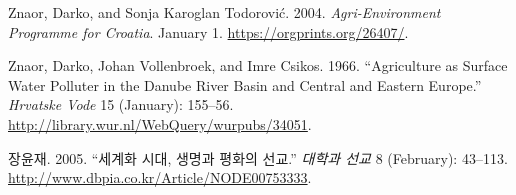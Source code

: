 \begin{CSLReferences}{1}{1}
Znaor, Darko, and Sonja Karoglan Todorović. 2004. \emph{Agri-Environment
Programme for Croatia}. January 1. \url{https://orgprints.org/26407/}.

Znaor, Darko, Johan Vollenbroek, and Imre Csikos. 1966. {``Agriculture
as Surface Water Polluter in the Danube River Basin and Central and
Eastern Europe.''} \emph{Hrvatske Vode} 15 (January): 155--56.
\url{http://library.wur.nl/WebQuery/wurpubs/34051}.

장윤재. 2005. {``세계화 시대, 생명과 평화의 선교.''} \emph{대학과 선교}
8 (February): 43--113.
\url{http://www.dbpia.co.kr/Article/NODE00753333}.

\end{CSLReferences}
